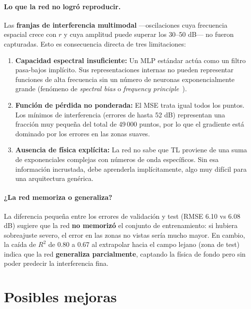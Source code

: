 \documentclass[12pt,a4paper]{article}
\begin{document}
\paragraph{Lo que la red no logró reproducir.}
Las \textbf{franjas de interferencia multimodal} —oscilaciones cuya
frecuencia espacial crece con $r$ y cuya amplitud puede superar los 30--50 dB—
no fueron capturadas. Esto es consecuencia directa de tres limitaciones:
\begin{enumerate}
  \item \textbf{Capacidad espectral insuficiente:} Un MLP estándar actúa
        como un filtro pasa-bajos implícito. Sus representaciones internas
        no pueden representar funciones de alta frecuencia sin un número de
        neuronas exponencialmente grande (fenómeno de \emph{spectral bias}
        o \emph{frequency principle}~\cite{rahaman2019}).
  \item \textbf{Función de pérdida no ponderada:} El MSE trata igual todos
        los puntos. Los mínimos de interferencia (errores de hasta 52 dB)
        representan una fracción muy pequeña del total de 49\,000 puntos, por
        lo que el gradiente está dominado por los errores en las zonas suaves.
  \item \textbf{Ausencia de física explícita:} La red no sabe que TL proviene
        de una suma de exponenciales complejas con números de onda específicos.
        Sin esa información incrustada, debe aprenderla implícitamente, algo
        muy difícil para una arquitectura genérica.
\end{enumerate}

\paragraph{¿La red memoriza o generaliza?}
La diferencia pequeña entre los errores de validación y test (RMSE 6.10 vs
6.08 dB) sugiere que la red \textbf{no memorizó} el conjunto de entrenamiento:
si hubiera sobreajuste severo, el error en las zonas no vistas sería mucho
mayor. En cambio, la caída de $R^2$ de 0.80 a 0.67 al extrapolar hacia el
campo lejano (zona de test) indica que la red \textbf{generaliza parcialmente},
captando la física de fondo pero sin poder predecir la interferencia fina.

\section{Posibles mejoras}
\end{document}
